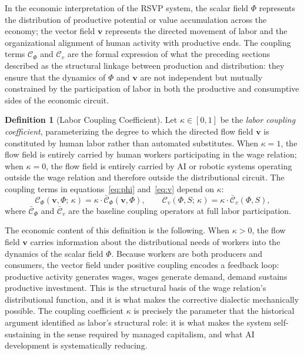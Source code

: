 \documentclass[11pt, a4paper]{article}
\theoremstyle{plain}
\theoremstyle{definition}
\newtheorem{definition}[theorem]{Definition}
\newcommand{\Phifield}{\Phi}
\newcommand{\vfield}{\mathbf{v}}
\newcommand{\Sfield}{S}
\newcommand{\coupling}{\kappa}
\begin{document}
In the economic interpretation of the RSVP system, the scalar field
$\Phifield$ represents the distribution of productive potential or value
accumulation across the economy; the vector field $\vfield$ represents the
directed movement of labor and the organizational alignment of human activity
with productive ends. The coupling terms $\mathcal{C}_\Phi$ and $\mathcal{C}_v$
are the formal expression of what the preceding sections described as the
structural linkage between production and distribution: they ensure that the
dynamics of $\Phifield$ and $\vfield$ are not independent but mutually
constrained by the participation of labor in both the productive and
consumptive sides of the economic circuit.

\begin{definition}[Labor Coupling Coefficient]
Let $\coupling \in [0,1]$ be the \emph{labor coupling coefficient},
parameterizing the degree to which the directed flow field $\vfield$ is
constituted by human labor rather than automated substitutes. When
$\coupling = 1$, the flow field is entirely carried by human workers
participating in the wage relation; when $\coupling = 0$, the flow field
is entirely carried by AI or robotic systems operating outside the wage
relation and therefore outside the distributional circuit. The coupling
terms in equations~\eqref{eq:phi} and~\eqref{eq:v} depend on $\coupling$:
\[
  \mathcal{C}_\Phi(\vfield, \Phifield;\, \coupling)
    = \coupling \cdot \bar{\mathcal{C}}_\Phi(\vfield, \Phifield),
  \qquad
  \mathcal{C}_v(\Phifield, \Sfield;\, \coupling)
    = \coupling \cdot \bar{\mathcal{C}}_v(\Phifield, \Sfield),
\]
where $\bar{\mathcal{C}}_\Phi$ and $\bar{\mathcal{C}}_v$ are the baseline
coupling operators at full labor participation.
\end{definition}

The economic content of this definition is the following. When $\coupling > 0$,
the flow field $\vfield$ carries information about the distributional needs of
workers into the dynamics of the scalar field $\Phifield$. Because workers are
both producers and consumers, the vector field under positive coupling encodes
a feedback loop: productive activity generates wages, wages generate demand,
demand sustains productive investment. This is the structural basis of the wage
relation's distributional function, and it is what makes the corrective
dialectic mechanically possible. The coupling coefficient $\coupling$ is
precisely the parameter that the historical argument identified as labor's
structural role: it is what makes the system self-sustaining in the sense
required by managed capitalism, and what AI development is systematically
reducing.
\end{document}
